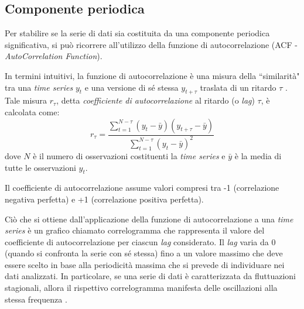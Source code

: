 \subsection{Componente periodica}
\label{subsec:stagionalita}
Per stabilire se la serie di dati sia costituita da una componente periodica significativa, si può ricorrere all'utilizzo della funzione di autocorrelazione (ACF - \textit{AutoCorrelation Function}).

In termini intuitivi, la funzione di autocorrelazione è una misura della ``similarità" tra una \textit{time series} $y_{t}$ e una versione di sé stessa $y_{t+\tau}$ traslata di un ritardo $\tau$ \cite{priestley1981spectral}. Tale misura $r_{\tau}$, detta \textit{coefficiente di autocorrelazione} al ritardo (o \textit{lag}) $\tau$, è calcolata come:
\begin{equation}
r_{\tau}=\frac{\sum_{t=1}^{N-\tau}(y_{t}-\bar{y})(y_{t+\tau}-\bar{y})}{\sum_{t=1}^{N-\tau}(y_{t}-\bar{y})^{2}}
\end{equation}
dove $N$ è il  numero di osservazioni costituenti la \textit{time series} e $\bar{y}$ è la media di tutte le osservazioni $y_{t}$.

Il coefficiente di autocorrelazione assume valori compresi tra -1 (correlazione negativa perfetta) e +1 (correlazione positiva perfetta). 

Ciò che si ottiene dall'applicazione della funzione di autocorrelazione a una \textit{time series} è un grafico chiamato correlogramma che rappresenta il valore del coefficiente di autocorrelazione per ciascun \textit{lag} considerato. Il \textit{lag} varia da 0 (quando si confronta la serie con sé stessa) fino a un valore massimo che deve essere scelto in base alla periodicità massima che si prevede di individuare nei dati analizzati. In particolare, se una serie di dati è caratterizzata da fluttuazioni stagionali, allora il rispettivo correlogramma manifesta delle oscillazioni alla stessa frequenza \cite{ACF}. 

